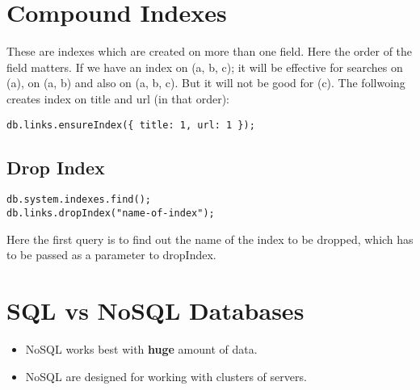 \documentclass[a4paper, 12pt]{article}
\begin{document}
\section{Compound Indexes}
These are indexes which are created on more than one field. Here the order of the field matters. If we have an index on (a, b, c); it will be effective for searches on (a), on (a, b) and also on (a, b, c). But it will not be good for (c). The follwoing creates index on title and url (in that order):
\begin{verbatim}
db.links.ensureIndex({ title: 1, url: 1 });
\end{verbatim}
\subsection{Drop Index}
\begin{verbatim}
db.system.indexes.find();
db.links.dropIndex("name-of-index");
\end{verbatim}
Here the first query is to find out the name of the index to be dropped, which has to be passed as a parameter to dropIndex.

\section{SQL vs NoSQL Databases}
\begin{itemize}
	\item NoSQL works best with \textbf{huge} amount of data.
	\item NoSQL are designed for working with clusters of servers.
\end{itemize}
\end{document}
